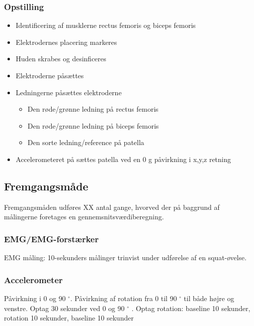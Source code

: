 \subsubsection{Opstilling}
\begin{itemize}
\item Identificering af musklerne rectus femoris og biceps femoris 
\item Elektrodernes placering markeres
\item Huden skrabes og desinficeres
\item Elektroderne påsættes
\item Ledningerne påsættes elektroderne
\begin{itemize}
\item Den røde/grønne ledning på rectus femoris
\item Den røde/grønne ledning på biceps femoris
\item Den sorte ledning/reference på patella 

\end{itemize} 
\item Accelerometeret på sættes patella ved en 0 g påvirkning i x,y,z retning
\end{itemize}


\subsection{Fremgangsmåde}
Fremgangsmåden udføres XX antal gange, hvorved der på baggrund af målingerne foretages en gennemsnitsværdiberegning.

\subsubsection{EMG/EMG-forstærker}
EMG måling: 10-sekunders målinger trinvist under udførelse af en squat-øvelse. 


\subsubsection{Accelerometer}
Påvirkning i 0 og 90 $^{\circ}$.
Påvirkning af rotation fra 0 til 90 $^{\circ}$ til både højre og venstre.
Optag 30 sekunder ved 0 og 90 $^{\circ}$ .
Optag rotation: baseline 10 sekunder, rotation 10 sekunder, baseline 10 sekunder




